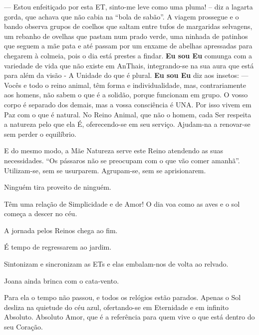— Estou enfeitiçado por esta ET, sinto-me leve como uma pluma! – diz a lagarta gorda, que achava que não cabia na “bola de sabão”.
\bigbreak
A viagem prossegue e o bando observa grupos de coelhos que saltam entre tufos de margaridas selvagens, um rebanho de ovelhas que pastam num prado verde, uma ninhada de patinhos que seguem a mãe pata e até passam por um enxame de abelhas apressadas para chegarem à colmeia, pois o dia está prestes a findar.
\bigbreak
\textbf{Eu sou Eu} comunga com a variedade de vida que não existe em AnThais, integrando-se na sua aura que está para além da visão - A Unidade do que é plural.
\bigbreak
\textbf{Eu sou Eu} diz aos insetos:
\bigbreak
— Vocês e todo o reino animal, têm forma e individualidade, mas, contrariamente aos homens, não sabem o que é a solidão, porque funcionam em grupo. O vosso corpo é separado dos demais, mas a vossa consciência é UNA. Por isso vivem em Paz com o que é natural.
\bigbreak
No Reino Animal, que não o homem, cada Ser respeita a natureza pelo que ela É, oferecendo-se em seu serviço. Ajudam-na a renovar-se sem perder o equilíbrio.

E do mesmo modo, a Mãe Natureza serve este Reino atendendo as suas necessidades.
\bigbreak
“Os pássaros não se preocupam com o que vão comer amanhã”.
\bigbreak
Utilizam-se, sem se usurparem. Agrupam-se, sem se aprisionarem.

Ninguém tira proveito de ninguém.

Têm uma relação de Simplicidade e de Amor!
\bigbreak
O dia voa como as aves e o sol começa a descer no céu.

A jornada pelos Reinos chega ao fim.

É tempo de regressarem ao jardim.

Sintonizam e sincronizam as ETs e elas embalam-nos de volta ao relvado.

Joana ainda brinca com o cata-vento.

Para ela o tempo não passou, e todos os relógios estão parados.
\bigbreak
Apenas o Sol desliza na quietude do céu azul, ofertando-se em Eternidade e em infinito Absoluto. Absoluto Amor, que é a referência para quem vive o que está dentro do seu Coração.
